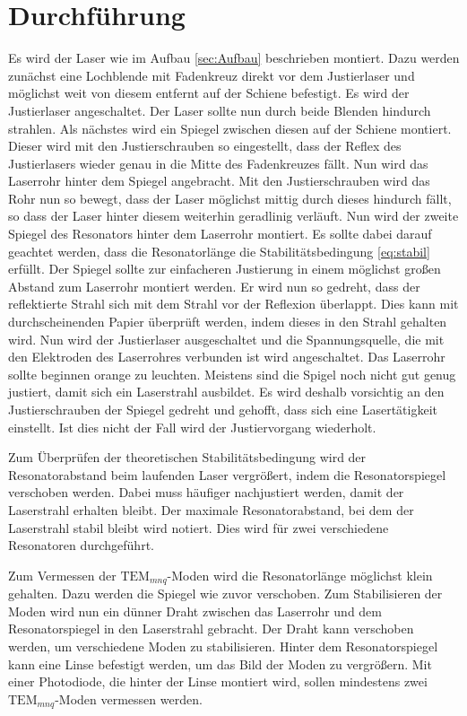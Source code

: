 
\section{Durchführung}
\label{sec:Durchführung}
Es wird der Laser wie im Aufbau \ref{sec:Aufbau} beschrieben montiert. Dazu werden zunächst eine Lochblende mit Fadenkreuz direkt vor dem Justierlaser und möglichst weit von diesem entfernt auf der Schiene befestigt. Es wird der Justierlaser angeschaltet. Der Laser sollte nun durch beide Blenden hindurch strahlen. Als nächstes wird ein Spiegel zwischen diesen auf der Schiene montiert. Dieser wird mit den Justierschrauben so eingestellt, dass der Reflex des Justierlasers wieder genau in die Mitte des Fadenkreuzes fällt. Nun wird das Laserrohr hinter dem Spiegel angebracht. Mit den Justierschrauben wird das Rohr nun so bewegt, dass der Laser möglichst mittig durch dieses hindurch fällt, so dass der Laser hinter diesem weiterhin geradlinig verläuft. Nun wird der zweite Spiegel des Resonators hinter dem Laserrohr montiert. Es sollte dabei darauf geachtet werden, dass die Resonatorlänge die Stabilitätsbedingung \eqref{eq:stabil} erfüllt. Der Spiegel sollte zur einfacheren Justierung in einem möglichst großen Abstand zum Laserrohr montiert werden. Er wird nun so gedreht, dass der reflektierte Strahl sich mit dem Strahl vor der Reflexion überlappt. Dies kann mit durchscheinenden Papier überprüft werden, indem dieses in den Strahl gehalten wird. Nun wird der Justierlaser ausgeschaltet und die Spannungsquelle, die mit den Elektroden des Laserrohres verbunden ist wird angeschaltet. Das Laserrohr sollte beginnen orange zu leuchten. Meistens sind die Spigel noch nicht gut genug justiert, damit sich ein Laserstrahl ausbildet. Es wird deshalb vorsichtig an den Justierschrauben der Spiegel gedreht und gehofft, dass sich eine Lasertätigkeit einstellt. Ist dies nicht der Fall wird der Justiervorgang wiederholt. 

Zum Überprüfen der theoretischen Stabilitätsbedingung wird der Resonatorabstand beim laufenden Laser vergrößert, indem die Resonatorspiegel verschoben werden. Dabei muss häufiger nachjustiert werden, damit der Laserstrahl erhalten bleibt. Der maximale Resonatorabstand, bei dem der Laserstrahl stabil bleibt wird notiert. Dies wird für zwei verschiedene Resonatoren durchgeführt.

Zum Vermessen der $\text{TEM}_{mnq}$-Moden wird die Resonatorlänge möglichst klein gehalten. Dazu werden die Spiegel wie zuvor verschoben. Zum Stabilisieren der Moden wird nun ein dünner Draht zwischen das Laserrohr und dem Resonatorspiegel in den Laserstrahl gebracht. Der Draht kann verschoben werden, um verschiedene Moden zu stabilisieren. Hinter dem Resonatorspiegel kann eine Linse befestigt werden, um das Bild der Moden zu vergrößern. Mit einer Photodiode, die hinter der Linse montiert wird, sollen mindestens zwei $\text{TEM}_{mnq}$-Moden vermessen werden.

